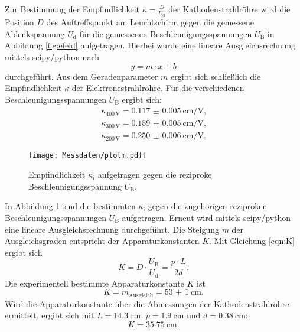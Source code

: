 Zur Bestimmung der Empfindlichkeit $\kappa=\frac{D}{U_\mathrm{d}}$ der Kathodenstrahlröhre wird die Position $D$ des Auftreffspunkt am Leuchtschirm gegen die gemessene Ablenkspannung $U_\mathrm{d}$ für die gemessenen Beschleunigungsspannungen $U_\mathrm{B}$ in Abbildung \ref{fig:efeld} aufgetragen.
Hierbei wurde eine lineare Ausgleichsrechnung mittels scipy/python \cite{scipy} nach
\begin{equation*}
	y=m\cdot x+b
\end{equation*}
durchgeführt.
Aus dem Geradenparameter %
$m$ ergibt sich schließlich die Empfindlichkeit $\kappa$ der Elektronestrahlröhre.
Für die verschiedenen Beschleunigungsspannungen $U_\mathrm{B}$ ergibt sich:
\begin{gather*}
	\kappa_{400\,\si{\volt}} =  \SI{0.117(5)}{\centi\meter\per\volt} \text{,}\\
	\kappa_{300\,\si{\volt}}  =  \SI{0.159(5)}{\centi\meter\per\volt} \text{,}\\
	\kappa_{200\,\si{\volt}}  =  \SI{0.250(6)}{\centi\meter\per\volt} \text{.}
\end{gather*}
\begin{figure}
  \centering
  \texttt{[image: Messdaten/plotm.pdf]}
  \caption{Empfindlichkeit $\kappa_i$ aufgetragen gegen die reziproke Beschleunigungsspannung $U_\mathrm{B}$.}
  \label{fig:m}
\end{figure}
In Abbildung \ref{fig:m} sind die bestimmten $\kappa_\mathrm{i}$ gegen die zugehörigen reziproken Beschleunigungsspannungen $U_\mathrm{B}$ aufgetragen.
Erneut wird mittels scipy/python \cite{scipy} eine lineare Ausgleichsrechnung durchgeführt.
Die Steigung $m$ der Ausgleichsgraden entspricht der Apparaturkonstanten $K$.
Mit Gleichung \eqref{eqn:K} ergibt sich
\begin{equation*}
	K= D \cdot \frac{U_\mathrm{B}}{U_\mathrm{d}}=\frac{p\cdot L}{2d} \text{.}
\end{equation*}
Die experimentell bestimmte Apparaturkonstante $K$ ist
\begin{equation*}
	K=m_\mathrm{Ausgleich} =  \SI{53(1)}{\centi\meter} \text{.}
\end{equation*}
Wird die Apparaturkonstante über die Abmessungen der Kathodenstrahlröhre ermittelt, ergibt sich mit $L=\SI{14.3}{\centi\meter}$, $p=\SI{1.9}{\centi\meter}$ und $d=\SI{0.38}{\centi\meter}$:
\begin{equation*}
	K=\SI{35.75}{\centi\meter}\text{.}
\end{equation*}

